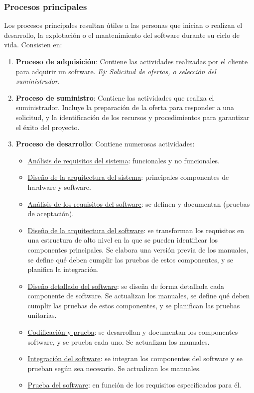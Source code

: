 \subsubsection{Procesos principales}
Los procesos principales resultan útiles a las personas que inician o realizan el desarrollo, la explotación o el mantenimiento del software durante su ciclo de vida. Consisten en:
\begin{enumerate}
    \item \textbf{Proceso de adquisición}: Contiene las actividades realizadas por el cliente para adquirir un software. \textit{Ej: Solicitud de ofertas, o selección del suministrador}.
    \item \textbf{Proceso de suministro}: Contiene las actividades que realiza el suministrador. Incluye la preparación de la oferta para responder a una solicitud, y la identificación de los recursos y procedimientos para garantizar el éxito del proyecto.
    \item\textbf{Proceso de desarrollo}: Contiene numerosas actividades:
    \begin{itemize}
        \item \uline{Análisis de requisitos del sistema}: funcionales y no funcionales.
        \item \uline{Diseño de la arquitectura del sistema}: principales componentes de hardware y software.
        \item \uline{Análisis de los requisitos del software}: se definen y documentan (pruebas de aceptación).
        \item \uline{Diseño de la arquitectura del software}: se transforman los requisitos en una estructura de alto nivel en la que se pueden identificar los componentes principales. Se elabora una versión previa de los manuales, se define qué deben cumplir las pruebas de estos componentes, y se planifica la integración.
        \item \uline{Diseño detallado del software}: se diseña de forma detallada cada componente de software. Se actualizan los manuales, se define qué deben cumplir las pruebas de estos componentes, y se planifican las pruebas unitarias.
        \item \uline{Codificación y prueba}: se desarrollan y documentan los componentes software, y se prueba cada uno. Se actualizan los manuales.
        \item \uline{Integración del software}: se integran los componentes del software y se prueban según sea necesario. Se actualizan los manuales.
        \item \uline{Prueba del software}: en función de los requisitos especificados para él.

\end{itemize}
\end{enumerate}
